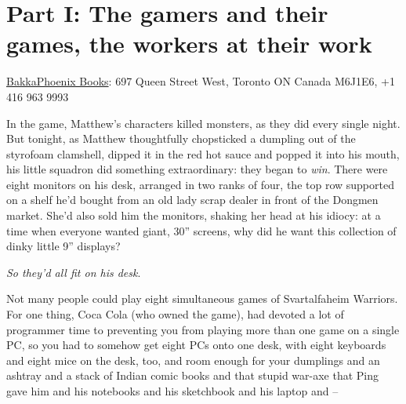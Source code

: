 \mainmatter

\chapter*{Part I: The gamers and their games, the workers at their work}

{\href{http://www.bakkaphoenixbooks.com/}{BakkaPhoenix Books}: 697 Queen Street West, Toronto ON Canada M6J1E6, +1 416 963 9993}

In the game, Matthew's characters killed monsters, as they did
every single night. But tonight, as Matthew thoughtfully
chopsticked a dumpling out of the styrofoam clamshell, dipped it in
the red hot sauce and popped it into his mouth, his little squadron
did something extraordinary: they began to \emph{win}.
There were eight monitors on his desk, arranged in two ranks of
four, the top row supported on a shelf he'd bought from an old lady
scrap dealer in front of the Dongmen market. She'd also sold him
the monitors, shaking her head at his idiocy: at a time when
everyone wanted giant, 30'' screens, why did he want this collection
of dinky little 9'' displays?

\emph{So they'd all fit on his desk}.

Not many people could play eight simultaneous games of
Svartalfaheim Warriors. For one thing, Coca Cola (who owned the
game), had devoted a lot of programmer time to preventing you from
playing more than one game on a single PC, so you had to somehow
get eight PCs onto one desk, with eight keyboards and eight mice on
the desk, too, and room enough for your dumplings and an ashtray
and a stack of Indian comic books and that stupid war-axe that Ping
gave him and his notebooks and his sketchbook and his laptop and
--

